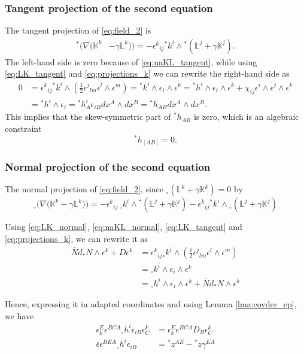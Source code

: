 \documentclass[a4paper, 11pt]{article}
\def\L{\mathbb{L}}
\def\K{\mathbb{K}}
\def\ga{\gamma}
\def\ep{\epsilon}
\def\na{\nabla}
\def\we{\wedge}
\def\tp#1{{}^\ast\!#1}
\def\np#1{{}_\circ#1}
\numberwithin{equation}{section}
\begin{document}
\subsubsection{Tangent projection of the second equation}
The tangent projection of \eqref{eq:field_2} is 
\begin{align*}
    \tp\Big(\na\big(\K^k &- \ga \L^k\big)\Big)= -\ep^k{}_{ij} \tp k^i \we \tp \left(\L^j + \ga \K^j\right).
\end{align*}
The left-hand side is zero because of \eqref{eq:naKL_tangent}, while using \eqref{eq:LK_tangent} and \eqref{eq:projections_k} we can rewrite the right-hand side as
\begin{align*}
    0 &= \ep^k{}_{ij} \tp k^i \we \left(\tfrac 1 2 \ep^j{}_{lm}\ep^l \we \ep^m\right) = \tp k^i \we \ep_i \we \ep^k  = \tp h^i \we \ep_i \we \ep^k + \chi_{ij}\ep^i \we \ep^j \we \ep^k  \\ &= \tp h^i \we \ep_i  = \tp h^i_A \ep_{iB} dx^A \we dx^B = \tp h_{AB}  dx^A \we dx^B.
\end{align*}
This implies that the skew-symmetric part of $\tp h_{AB}$ is zero, which is an algebraic constraint 
\begin{equation}
      \boxed{\tp h_{[AB]} = 0.}
      \label{eq:skew_h}
\end{equation}

\subsubsection{Normal projection of the second equation}
The normal projection of \eqref{eq:field_2}, since $\np(\L^k + \ga \K^k) = 0$ by 
\[\np\Big(\na\big(\K^k - \ga \L^k\big)\Big)= -\ep^k{}_{ij} \, \np k^i \we \tp \left(\L^j + \ga \K^j\right) - \ep^k{}_{ij}\tp k^i \we \np\left(\L^j + \ga\K^j\right) \]

Using \eqref{eq:LK_normal}, \eqref{eq:naKL_normal}, \eqref{eq:LK_tangent} and \eqref{eq:projections_k}, we can rewrite it as
\begin{align*}
   \bar N d_\ast N \we \ep^k + D\ep^k &= \ep^k{}_{ij} \np k^i \we \left(\tfrac 1 2 \ep^j{}_{lm} \ep^l \we \ep^m\right) \\ 
     &= \np k^i \we \ep_i \we \ep^k \\ 
     &= \np h^i \we \ep_i \we \ep^k + \bar N d_\ast N \we \ep^k
\end{align*}

Hence, expressing it in adapted coordinates and using Lemma \ref{lma:covder_ep}, we have
\begin{align}
    \ep^E_k \ep^{BCA} \np h^i \ep_{iB} \ep^k_C &=  \ep^E_k \ep^{BCA}D_B \ep^k_C   \nonumber \\
\bar \ep \ep^{BEA} \np h^i \ep_{iB} &= \tp z^{AE} - \tp z \ga^{EA} \label{eq:normal_second_eq}
\end{align}
\end{document}
